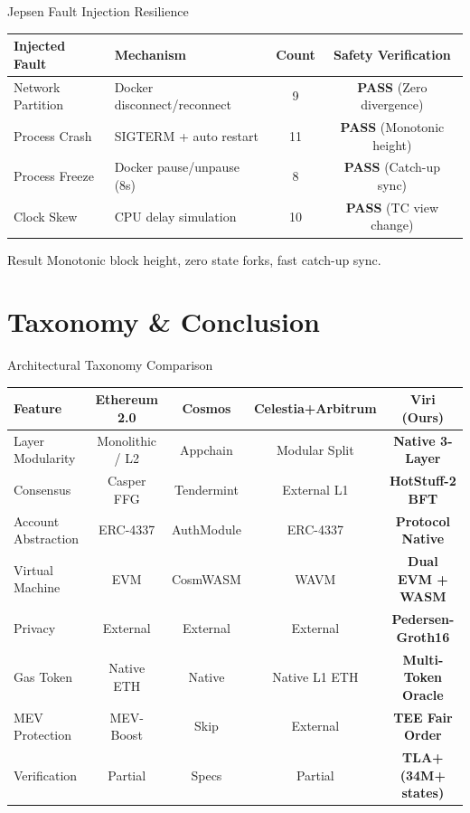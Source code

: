 \documentclass[10pt]{beamer}
\begin{document}
\begin{frame}{Jepsen Fault Injection Resilience}
  \begin{table}
    \centering
    \small
    \begin{tabular}{llcc}
      \toprule
      \textbf{Injected Fault} & \textbf{Mechanism} & \textbf{Count} & \textbf{Safety Verification} \\
      \midrule
      Network Partition & Docker disconnect/reconnect & 9 & \textbf{PASS} (Zero divergence) \\
      Process Crash & SIGTERM + auto restart & 11 & \textbf{PASS} (Monotonic height) \\
      Process Freeze & Docker pause/unpause (8s) & 8 & \textbf{PASS} (Catch-up sync) \\
      Clock Skew & CPU delay simulation & 10 & \textbf{PASS} (TC view change) \\
      \bottomrule
    \end{tabular}
  \end{table}
  \begin{block}{Result}
    Monotonic block height, zero state forks, fast catch-up sync.
  \end{block}
\end{frame}

\section{Taxonomy & Conclusion}

\begin{frame}{Architectural Taxonomy Comparison}
  \begin{table}
    \centering
    \tiny
    \begin{tabular}{lcccc}
      \toprule
      \textbf{Feature} & \textbf{Ethereum 2.0} & \textbf{Cosmos} & \textbf{Celestia+Arbitrum} & \textbf{Viri (Ours)} \\
      \midrule
      Layer Modularity & Monolithic / L2 & Appchain & Modular Split & \textbf{Native 3-Layer} \\
      Consensus & Casper FFG & Tendermint & External L1 & \textbf{HotStuff-2 BFT} \\
      Account Abstraction & ERC-4337 & AuthModule & ERC-4337 & \textbf{Protocol Native} \\
      Virtual Machine & EVM & CosmWASM & WAVM & \textbf{Dual EVM + WASM} \\
      Privacy & External & External & External & \textbf{Pedersen-Groth16} \\
      Gas Token & Native ETH & Native & Native L1 ETH & \textbf{Multi-Token Oracle} \\
      MEV Protection & MEV-Boost & Skip & External & \textbf{TEE Fair Order} \\
      Verification & Partial & Specs & Partial & \textbf{TLA+ (34M+ states)} \\
      \bottomrule
    \end{tabular}
  \end{table}
\end{frame}
\end{document}
